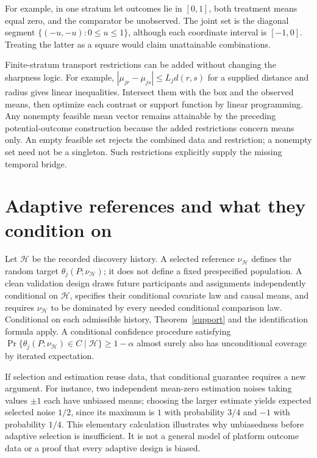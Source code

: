 \documentclass[11pt]{article}
\theoremstyle{remark}\newtheorem{remark}[theorem]{Remark}
\begin{document}
For example, in one stratum let outcomes lie in $[0,1]$, both treatment means equal zero, and the comparator be unobserved. The joint set is the diagonal segment $\{(-u,-u):0\leq u\leq1\}$, although each coordinate interval is $[-1,0]$. Treating the latter as a square would claim unattainable combinations.

Finite-stratum transport restrictions can be added without changing the sharpness logic. For example,
$|\mu_{jr}-\mu_{js}|\leq L_jd(r,s)$
for a supplied distance and radius gives linear inequalities. Intersect them with the box and the observed means, then optimize each contrast or support function by linear programming. Any nonempty feasible mean vector remains attainable by the preceding potential-outcome construction because the added restrictions concern means only. An empty feasible set rejects the combined data and restriction; a nonempty set need not be a singleton. Such restrictions explicitly supply the missing temporal bridge.

\section{Adaptive references and what they condition on}
Let $\mathcal H$ be the recorded discovery history. A selected reference $\nu_{\mathcal H}$ defines the random target
$\theta_j(P;\nu_{\mathcal H})$; it does not define a fixed prespecified population. A clean validation design draws future participants and assignments independently conditional on $\mathcal H$, specifies their conditional covariate law and causal means, and requires $\nu_{\mathcal H}$ to be dominated by every needed conditional comparison law. Conditional on each admissible history, Theorem~\ref{support} and the identification formula apply. A conditional confidence procedure satisfying
$\Pr\{\theta_j(P;\nu_{\mathcal H})\in C\mid\mathcal H\}\geq1-\alpha$
almost surely also has unconditional coverage by iterated expectation.

If selection and estimation reuse data, that conditional guarantee requires a new argument. For instance, two independent mean-zero estimation noises taking values $\pm1$ each have unbiased means; choosing the larger estimate yields expected selected noise $1/2$, since its maximum is $1$ with probability $3/4$ and $-1$ with probability $1/4$. This elementary calculation illustrates why unbiasedness before adaptive selection is insufficient. It is not a general model of platform outcome data or a proof that every adaptive design is biased.
\end{document}
